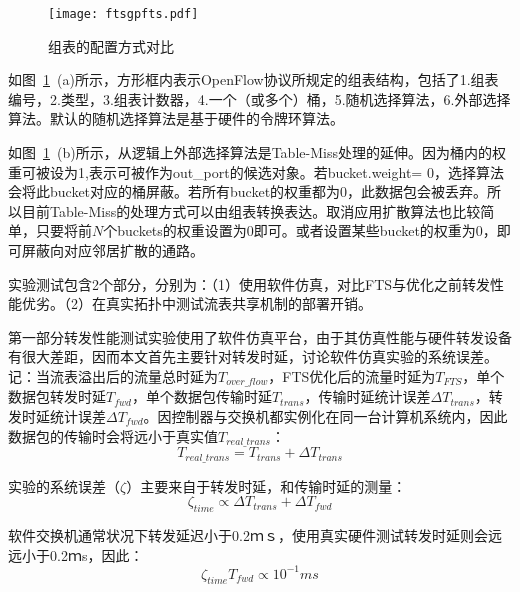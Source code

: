 \begin{figure}[!ht]
	\centering 
	\vspace{-1.5mm} 
	\texttt{[image: ftsgpfts.pdf]}
	\caption{组表的配置方式对比} \label{fig:ftsgpfts}
\end{figure}

如图~\ref{fig:ftsgpfts}~(a)所示，方形框内表示OpenFlow协议所规定的组表结构，包括了1.组表编号，2.类型，3.组表计数器，4.一个（或多个）桶，5.随机选择算法，6.外部选择算法。默认的随机选择算法是基于硬件的令牌环算法。

如图~\ref{fig:ftsgpfts}~(b)所示，从逻辑上外部选择算法是Table-Miss处理的延伸。因为桶内的权重可被设为1,表示可被作为out\_port的候选对象。若bucket.weight= 0，选择算法会将此bucket对应的桶屏蔽。若所有bucket的权重都为0，此数据包会被丢弃。所以目前Table-Miss的处理方式可以由组表转换表达。取消应用扩散算法也比较简单，只要将前$ N $个buckets的权重设置为0即可。或者设置某些bucket的权重为0，即可屏蔽向对应邻居扩散的通路。





\label{chapftsevaluation}

实验测试包含2个部分，分别为：（1）使用软件仿真，对比FTS与优化之前转发性能优劣。（2）在真实拓扑中测试流表共享机制的部署开销。

第一部分转发性能测试实验使用了软件仿真平台，由于其仿真性能与硬件转发设备有很大差距，因而本文首先主要针对转发时延，讨论软件仿真实验的系统误差。记：当流表溢出后的流量总时延为$T_{over\_flow}$，FTS优化后的流量时延为$T_{FTS}$，单个数据包转发时延$T_{fwd}$，单个数据包传输时延$T_{trans}$，传输时延统计误差$\Delta T_{trans}$，转发时延统计误差$\Delta T_{fwd}$。因控制器与交换机都实例化在同一台计算机系统内，因此数据包的传输时会将远小于真实值$T_{real\_trans}$：
\begin{equation}\label{fts7}
T_{real\_trans} = T_{trans} + \Delta T_{trans}
\end{equation}

实验的系统误差（$\zeta$）主要来自于转发时延，和传输时延的测量：
\begin{equation}\label{fts8}
\zeta_{time} \propto \Delta T_{trans} + \Delta T_{fwd}
\end{equation}

软件交换机通常状况下转发延迟小于0.2ｍｓ，使用真实硬件测试转发时延则会远远小于0.2ｍs，因此：
\begin{equation}\label{fts9}
\zeta_{time} T_{fwd} \propto 10^{-1}ms
\end{equation}

